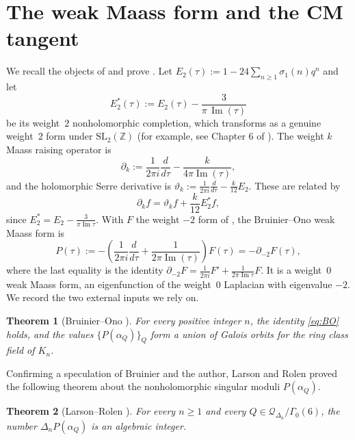 \documentclass[12pt]{amsart}
\newtheorem{theorem}{Theorem}[section]
\theoremstyle{definition}
\theoremstyle{remark}
\newcommand{\Z}{\mathbb{Z}}
\newcommand{\cQ}{\mathcal{Q}}
\newcommand{\im}{\operatorname{Im}}
\begin{document}
\section{The weak Maass form and the CM tangent}\label{sec:tangent}

We recall the objects of \cite{BOAIM} and prove . Let
$E_2(\tau):=1-24\sum_{n\ge1}\sigma_1(n)q^n$ and let
\[
E_2^*(\tau):=E_2(\tau)-\frac{3}{\pi\,\im(\tau)}
\]
be its weight~$2$ nonholomorphic completion, which transforms as a genuine weight~$2$ form
under $\mathrm{SL}_2(\Z)$ (for example, see Chapter 6 of \cite{BFOR}).  The weight $k$ Maass raising operator is
$$\partial_k:=\frac{1}{2\pi i}\frac{d}{d\tau}-\frac{k}{4\pi\im(\tau)},$$
and the holomorphic
Serre derivative is $\vartheta_k:=\frac{1}{2\pi i}\frac{d}{d\tau}-\frac{k}{12}E_2$. These are
related by
\begin{equation}\label{eq:serre-raise}
\partial_kf=\vartheta_kf+\frac{k}{12}E_2^*f,
\end{equation}
since $E_2^*=E_2-\tfrac{3}{\pi\im\tau}$. With $F$ the weight $-2$ form of ,
the Bruinier--Ono weak Maass form is
\[
P(\tau):=-\left(\frac{1}{2\pi i}\frac{d}{d\tau}+\frac{1}{2\pi\im(\tau)}\right)F(\tau)
=-\partial_{-2}F(\tau),
\]
where the last equality is the identity $\partial_{-2}F=\frac{1}{2\pi i}F'+\frac{1}{2\pi\im\tau}F$.
It is a weight~$0$ weak Maass form, an eigenfunction of the weight~$0$ Laplacian with
eigenvalue $-2$. We record the two external inputs we rely on.

\begin{theorem}[Bruinier--Ono \cite{BOAIM}]\label{thm:BO}
For every positive integer $n$, the identity \eqref{eq:BO} holds, and the values
$\{P(\alpha_Q)\}_{Q}$ form a union of Galois orbits for the ring class field of $K_n$.
\end{theorem}

Confirming a speculation of Bruinier and the author, Larson and Rolen proved the following theorem about the nonholomorphic singular moduli $P(\alpha_Q)$.

\begin{theorem}[Larson--Rolen \cite{LarsonRolen}]\label{thm:LR}
For every $n\ge1$ and every $Q\in\cQ_{\Delta_n}/\Gamma_0(6)$, the number
$\Delta_nP(\alpha_Q)$ is an algebraic integer.
\end{theorem}
\end{document}

